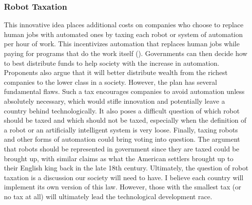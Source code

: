 \subsubsection{Robot Taxation} 
This innovative idea places additional costs on companies who choose to replace human jobs with automated ones by taxing each robot or system of automation per hour of work. This incentivizes automation that replaces human jobs while paying for programs that do the work itself (\cite{abbottShouldRobotsPayTaxes}). Governments can then decide how to best distribute funds to help society with the increase in automation. Proponents also argue that it will better distribute wealth from the richest companies to the lower class in a society. However, the plan has several fundamental flaws. Such a tax encourages companies to avoid automation unless absolutely necessary, which would stifle innovation and potentially leave a country behind technologically. It also poses a difficult question of which robot should be taxed and which should not be taxed, especially when the definition of a robot or an artificially intelligent system is very loose. Finally, taxing robots and other forms of automation could bring voting into question. The argument that robots should be represented in government since they are taxed could be brought up, with similar claims as what the American settlers brought up to their English king back in the late 18th century. Ultimately, the question of robot taxation is a discussion our society will need to have. I believe each country will implement its own version of this law. However, those with the smallest tax (or no tax at all) will ultimately lead the technological development race.

